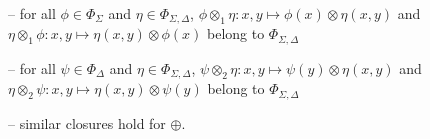 \noindent --
for all $\phi \in \Phi_\Sigma$ and $\eta \in \Phi_{\Sigma, \Delta}$,
$\phi \otimes_1 \eta: x, y \mapsto \phi(x) \otimes \eta(x, y)$ and\\
\phantom{--} $\eta \otimes_1 \phi: x, y \mapsto \eta(x, y) \otimes \phi(x)$
belong to $\Phi_{\Sigma, \Delta}$

\noindent --
for all $\psi \in \Phi_\Delta$ and $\eta \in \Phi_{\Sigma, \Delta}$,
$\psi \otimes_2 \eta: x, y \mapsto \psi(y) \otimes \eta(x, y)$ and\\
\phantom{--} $\eta \otimes_2 \psi: x, y \mapsto \eta(x, y) \otimes \psi(y)$
belong to $\Phi_{\Sigma, \Delta}$

\noindent --
similar closures hold for $\oplus$.


